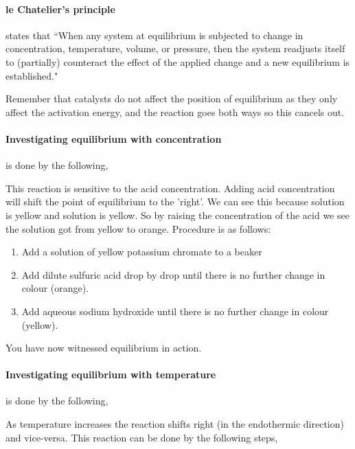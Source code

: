 	\paragraph{le Chatelier’s principle} states that ``When any system at equilibrium is subjected to change in concentration, temperature, volume, or pressure, then the system readjusts itself to (partially) counteract the effect of the applied change and a new equilibrium is established."
	
	Remember that catalysts do not affect the position of equilibrium as they only affect the activation energy, and the reaction goes both ways so this cancels out.
	
	\paragraph{Investigating equilibrium with concentration} is done by the following,
	
	\begin{center}
	\end{center}
	This reaction is sensitive to the acid concentration. Adding acid concentration will shift the point of equilibrium to the 'right'. We can see this because  solution is yellow and  solution is yellow. So by raising the concentration of the acid we see the solution got from yellow to orange.
	Procedure is as follows:
	\begin{enumerate}
		\item Add a solution of yellow potassium chromate to a beaker
		\item Add dilute sulfuric acid drop by drop until there is no further change in colour (orange).
		\item Add aqueous sodium hydroxide until there is no further change in colour (yellow).
	\end{enumerate}
	You have now witnessed equilibrium in action.
	\paragraph{Investigating equilibrium with temperature} is done by the following,
	
	\begin{center}
	\end{center}
	As temperature increases the reaction shifts right (in the endothermic direction) and vice-versa. This reaction can be done by the following steps,
	
